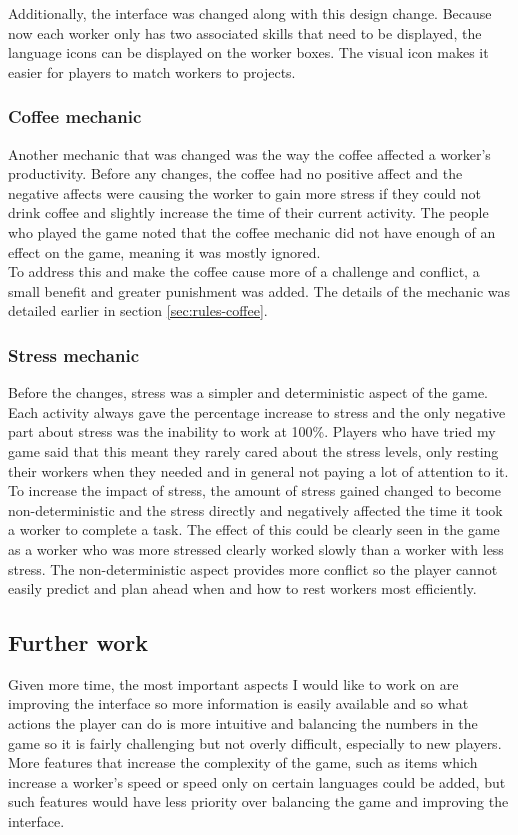 \documentclass[11pt]{article}
\newcommand{\n}[0]{\\[\baselineskip]}
\begin{document}
\noindent
Additionally, the interface was changed along with this design change. Because now each worker only has two associated skills that need to be displayed, the language icons can be displayed on the worker boxes. The visual icon makes it easier for players to match workers to projects. 


\subsubsection{Coffee mechanic}
Another mechanic that was changed was the way the coffee affected a worker's productivity. Before any changes, the coffee had no positive affect and the negative affects were causing the worker to gain more stress if they could not drink coffee and slightly increase the time of their current activity. The people who played the game noted that the coffee mechanic did not have enough of an effect on the game, meaning it was mostly ignored. 
\n
To address this and make the coffee cause more of a challenge and conflict, a small benefit and greater punishment was added. The details of the mechanic was detailed earlier in section \ref{sec:rules-coffee}. 

\subsubsection{Stress mechanic}
Before the changes, stress was a simpler and deterministic aspect of the game. Each activity always gave the percentage increase to stress and the only negative part about stress was the inability to work at 100\%. Players who have tried my game said that this meant they rarely cared about the stress levels, only resting their workers when they needed and in general not paying a lot of attention to it.
\n
To increase the impact of stress, the amount of stress gained changed to become non-deterministic and the stress directly and negatively affected the time it took a worker to complete a task. The effect of this could be clearly seen in the game as a worker who was more stressed clearly worked slowly than a worker with less stress. The non-deterministic aspect provides more conflict so the player cannot easily predict and plan ahead when and how to rest workers most efficiently. 

\subsection{Further work}
Given more time, the most important aspects I would like to work on are improving the interface so more information is easily available and so what actions the player can do is more intuitive and balancing the numbers in the game so it is fairly challenging but not overly difficult, especially to new players.
\n
More features that increase the complexity of the game, such as items which increase a worker's speed or speed only on certain languages could be added, but such features would have less priority over balancing the game and improving the interface. 
\end{document}
